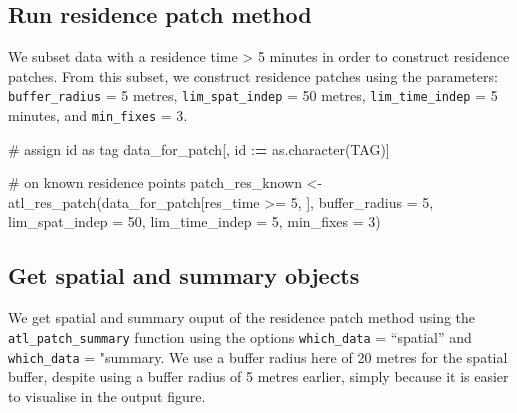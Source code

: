 \documentclass[]{scrreprt}
\newenvironment{Shaded}{}{}
\newcommand{\CommentTok}[1]{\textcolor[rgb]{0.00,0.50,0.00}{#1}}
\newcommand{\DataTypeTok}[1]{#1}
\newcommand{\DecValTok}[1]{#1}
\newcommand{\ErrorTok}[1]{\textcolor[rgb]{1.00,0.00,0.00}{\textbf{#1}}}
\newcommand{\KeywordTok}[1]{\textcolor[rgb]{0.00,0.00,1.00}{#1}}
\newcommand{\NormalTok}[1]{#1}
\newcommand{\OperatorTok}[1]{#1}
\newcommand{\StringTok}[1]{\textcolor[rgb]{0.00,0.50,0.50}{#1}}
\begin{document}
\hypertarget{run-residence-patch-method}{%
\subsection{Run residence patch method}\label{run-residence-patch-method}}

We subset data with a residence time \textgreater{} 5 minutes in order to construct residence patches.
From this subset, we construct residence patches using the parameters: \texttt{buffer\_radius} = 5 metres, \texttt{lim\_spat\_indep} = 50 metres, \texttt{lim\_time\_indep} = 5 minutes, and \texttt{min\_fixes} = 3.

\begin{Shaded}
\begin{Highlighting}[]
\CommentTok{# assign id as tag}
\NormalTok{data_for_patch[, id }\OperatorTok{:}\ErrorTok{=}\StringTok{ }\KeywordTok{as.character}\NormalTok{(TAG)]}

\CommentTok{# on known residence points}
\NormalTok{patch_res_known <-}\StringTok{ }\KeywordTok{atl_res_patch}\NormalTok{(data_for_patch[res_time }\OperatorTok{>=}\StringTok{ }\DecValTok{5}\NormalTok{, ], }
                                \DataTypeTok{buffer_radius =} \DecValTok{5}\NormalTok{,}
                                \DataTypeTok{lim_spat_indep =} \DecValTok{50}\NormalTok{,}
                                \DataTypeTok{lim_time_indep =} \DecValTok{5}\NormalTok{,}
                                \DataTypeTok{min_fixes =} \DecValTok{3}\NormalTok{)}
\end{Highlighting}
\end{Shaded}

\hypertarget{get-spatial-and-summary-objects}{%
\subsection{Get spatial and summary objects}\label{get-spatial-and-summary-objects}}

We get spatial and summary ouput of the residence patch method using the \texttt{atl\_patch\_summary} function using the options \texttt{which\_data} = ``spatial'' and \texttt{which\_data} = "summary.
We use a buffer radius here of 20 metres for the spatial buffer, despite using a buffer radius of 5 metres earlier, simply because it is easier to visualise in the output figure.
\end{document}
